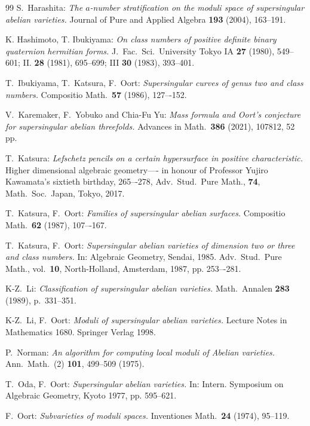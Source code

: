 \documentclass[11pt]{amsart}
\numberwithin{equation}{section}
\theoremstyle{definition}
\theoremstyle{remark}
\begin{document}
\begin{thebibliography}{99}
 S.\ Harashita:
{\sl The $a$-number stratification on the moduli space of 
supersingular abelian varieties.} 
Journal of Pure and Applied Algebra \textbf{193} (2004), 163--191.

 K. Hashimoto, T. Ibukiyama: 
{\sl On class numbers of positive definite binary quaternion hermitian forms.} 
J.\ Fac.\ Sci.\ University Tokyo IA \textbf{27} (1980), 549--601; II. 
\textbf{28} (1981), 695--699; III \textbf{30} (1983), 393--401.

T.\ Ibukiyama, T.\ Katsura, F.\ Oort: 
{\sl Supersingular curves of genus two and class numbers.} 
Compositio Math.\ \textbf{57} (1986), 127–-152.

  V.\ Karemaker, F.\ Yobuko and Chia-Fu Yu: 
{\sl Mass formula and Oort's conjecture for supersingular abelian threefolds.} 
Advances in Math.\ \textbf{386}
(2021), 107812, 52 pp.

T.\ Katsura:
{\sl Lefschetz pencils on a certain hypersurface in positive characteristic.}
Higher dimensional algebraic geometry—-
in honour of Professor Yujiro Kawamata's
sixtieth birthday, 265–-278, Adv.\ Stud.\ Pure Math., \textbf{74}, 
Math.\ Soc.\ Japan, 
Tokyo, 2017.

 T.\ Katsura, F.\ Oort: 
{\sl Families of supersingular abelian surfaces.} 
Compositio Math.\ \textbf{62} (1987), 107–-167.

 T.\ Katsura, F.\ Oort: 
{\sl Supersingular abelian varieties of dimension two or three 
and class numbers.} 
In: Algebraic Geometry, Sendai, 1985. Adv.\ Stud.\ 
Pure Math., vol.\ \textbf{10}, North-Holland, Amsterdam,
1987, pp. 253–-281.



 K-Z.\ Li: 
{\sl Classification of supersingular abelian varieties.}
Math.\ Annalen \textbf{283} (1989), p.\ 331--351.

 K-Z.\ Li, F.\ Oort: 
{\sl Moduli of supersingular abelian varieties.}
Lecture Notes in Mathematics 1680. Springer Verlag 1998.


P.\ Norman:
{\sl An algorithm for computing local moduli of Abelian varieties.}
Ann.\ Math.\ (2) {\bf 101}, 499--509 (1975).

 T.\ Oda, F.\ Oort:
{\sl Supersingular abelian varieties.} 
In: Intern. Symposium on Algebraic Geometry, Kyoto 1977, pp. 595--621.

 F.\ Oort: {\sl Subvarieties of moduli spaces.} 
Inventiones Math.\ \textbf{24} (1974), 95--119.


\end{thebibliography}
\end{document}

